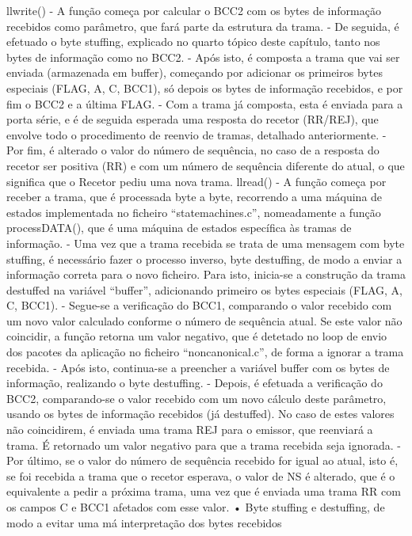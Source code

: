 \documentclass[article, a4paper, 11pt, oneside]{memoir}
\begin{document}
  llwrite()
 - A função começa por calcular o BCC2 com os bytes de informação recebidos como parâmetro, que fará parte da estrutura da trama.
 - De seguida, é efetuado o byte stuffing, explicado no quarto tópico deste capítulo, tanto nos bytes de informação como no BCC2.
 - Após isto, é composta a trama que vai ser enviada (armazenada em buffer), começando por adicionar os primeiros bytes especiais (FLAG, A, C, BCC1), só depois os bytes de informação recebidos, e por fim o BCC2 e a última FLAG.
 - Com a trama já composta, esta é enviada para a porta série, e é de seguida esperada uma resposta do recetor (RR/REJ), que envolve todo o procedimento de reenvio de tramas, detalhado anteriormente.
 - Por fim, é alterado o valor do número de sequência, no caso de a resposta do recetor ser positiva (RR) e com um número de sequência diferente do atual, o que significa que o Recetor pediu uma nova trama.
  llread()
  - A função começa por receber a trama, que é processada byte a byte, recorrendo a uma máquina de estados implementada no ficheiro “statemachines.c”, nomeadamente a função processDATA(), que é uma máquina de estados específica às tramas de informação.
  - Uma vez que a trama recebida se trata de uma mensagem com byte stuffing, é necessário fazer o processo inverso, byte destuffing, de modo a enviar a informação correta para o novo ficheiro. Para isto, inicia-se a construção da trama destuffed na variável “buffer”, adicionando primeiro os bytes especiais (FLAG, A, C, BCC1).
 - Segue-se a verificação do BCC1, comparando o valor recebido com um novo valor calculado conforme o número de sequência atual. Se este valor não coincidir, a função retorna um valor negativo, que é detetado no loop de envio dos pacotes da aplicação no ficheiro “noncanonical.c”, de forma a ignorar a trama recebida.
 - Após isto, continua-se a preencher a variável buffer com os bytes de informação, realizando o byte destuffing.
 - Depois, é efetuada a verificação do BCC2, comparando-se o valor recebido com um novo cálculo deste parâmetro, usando os bytes de informação recebidos (já destuffed). No caso de estes valores não coincidirem, é enviada uma trama REJ para o emissor, que reenviará a trama. É retornado um valor negativo para que a trama recebida seja ignorada.
- Por último, se o valor do número de sequência recebido for igual ao atual, isto é, se foi recebida a trama que o recetor esperava, o valor de NS é alterado, que é o equivalente a pedir a próxima trama, uma vez que é enviada uma trama RR com os campos C e BCC1 afetados com esse valor.
•	Byte stuffing e destuffing, de modo a evitar uma má interpretação dos bytes recebidos
\end{document}

